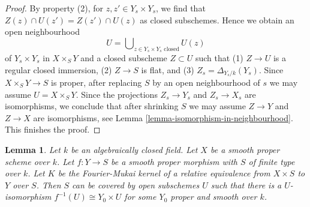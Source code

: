 \documentclass{stacks-project}
\theoremstyle{plain}
\newtheorem{lemma}[subsection]{Lemma}
\theoremstyle{definition}
\theoremstyle{remark}
\numberwithin{equation}{subsection}
\begin{document}
\begin{proof}
\noindent
By property (2), for $z, z' \in Y_s \times Y_s$, we
find that $Z(z) \cap U(z') = Z(z') \cap U(z)$ as closed subschemes.
Hence we obtain an open neighbourhood
$$
U = \bigcup\nolimits_{z \in Y_s \times Y_s\text{ closed}} U(z)
$$
of $Y_s \times Y_s$ in $X \times_S Y$ and a closed subscheme $Z \subset U$
such that (1) $Z \to U$ is a regular closed immersion,
(2) $Z \to S$ is flat, and (3) $Z_s = \Delta_{Y_s/k}(Y_s)$.
Since $X \times_S Y \to S$ is proper, after replacing $S$
by an open neighbourhood of $s$ we may assume $U = X \times_S Y$.
Since the projections $Z_s \to Y_s$ and $Z_s \to X_s$
are isomorphisms, we conclude that after shrinking $S$
we may assume $Z \to Y$ and $Z \to X$ are isomorphisms, see
Lemma \ref{lemma-isomorphism-in-neighbourhood}.
This finishes the proof.
\end{proof}

\begin{lemma}
\label{lemma-no-deformations-better}
Let $k$ be an algebraically closed field. Let $X$
be a smooth proper scheme over $k$.
Let $f : Y \to S$ be a smooth proper morphism with $S$ of finite type over $k$.
Let $K$ be the Fourier-Mukai kernel of a relative equivalence
from $X \times S$ to $Y$ over $S$. Then $S$ can be covered by
open subschemes $U$ such that there is a $U$-isomorphism
$f^{-1}(U) \cong Y_0 \times U$ for some $Y_0$ proper and smooth over $k$.
\end{lemma}
\end{document}
